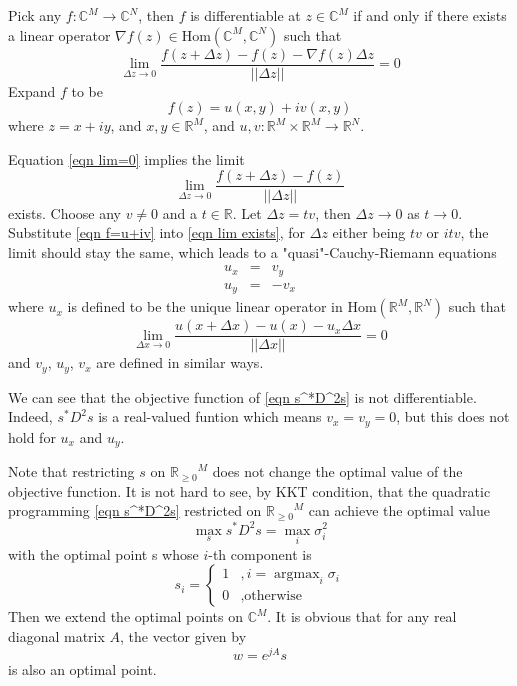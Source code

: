 \documentclass[12pt]{article}
\theoremstyle{remark}
\DeclareMathOperator*{\argmax}{argmax}
\begin{document}
Pick any $f:\mathbb{C}^M\rightarrow\mathbb{C}^N$, then $f$ is differentiable at $z\in\mathbb{C}^M$ if and only if there exists a linear operator $\nabla f(z)\in\mbox{Hom}\left(\mathbb{C}^M,\mathbb{C}^N \right)$ such that
\begin{equation}
	\lim_{\Delta z\rightarrow0}\frac{f(z+\Delta z)-f(z)-\nabla f(z)\Delta z}{||\Delta z||}=0\label{eqn lim=0}
\end{equation}
Expand $f$ to be 
\begin{equation}
	f(z)=u(x,y)+iv(x,y)\label{eqn f=u+iv}
\end{equation}
where $z=x+iy$, and $x,y\in\mathbb{R}^M$, and $u,v:\mathbb{R}^M\times\mathbb{R}^M\rightarrow\mathbb{R}^N$.

Equation \ref{eqn lim=0} implies the limit
\begin{equation}
	\lim_{\Delta z\rightarrow0}\frac{f(z+\Delta z)-f(z)}{||\Delta z||}\label{eqn lim exists}
\end{equation}
exists. Choose any $v\not=0$ and a $t\in\mathbb{R}$. Let $\Delta z=tv$, then $\Delta z\rightarrow0$ as $t\rightarrow0$. Substitute \ref{eqn f=u+iv} into \ref{eqn lim exists}, for $\Delta z$ either being $tv$ or $itv$, the limit should stay the same, which leads to a "quasi"-Cauchy-Riemann equations
\begin{eqnarray*}
	u_x&=&v_y\\
	u_y&=&-v_x
\end{eqnarray*}
where $u_x$ is defined to be the unique linear operator in $\mbox{Hom}\left(\mathbb{R}^M,\mathbb{R}^N\right)$ such that
$$\lim_{\Delta x\rightarrow0}\frac{u(x+\Delta x)-u(x)-u_x\Delta x}{||\Delta x||}=0$$
and $v_y$, $u_y$, $v_x$ are defined in similar ways.

We can see that the objective function of \ref{eqn s^*D^2s} is not differentiable. Indeed, $s^*D^2s$ is a real-valued funtion which means $v_x=v_y=0$, but this does not hold for $u_x$ and $u_y$.

Note that restricting $s$ on ${\mathbb{R}_{\geq0}}^M$ does not change the optimal value of the objective function. It is not hard to see, by KKT condition, that the quadratic programming \ref{eqn s^*D^2s} restricted on ${\mathbb{R}_{\geq0}}^M$ can achieve the optimal value $$\max_ss^*D^2s=\max_i \sigma_i^2$$ with the optimal point s whose $i$-th component is
$$
s_i=\left\{ 
\begin{matrix}
	1&,i=\argmax_i\sigma_i\\
	0&,\mbox{otherwise}	
\end{matrix}
\right.
$$
Then we extend the optimal points on $\mathbb{C}^M$. It is obvious that for any real diagonal matrix $A$, the vector given by
$$w=e^{jA}s$$
is also an optimal point.
\end{document}
